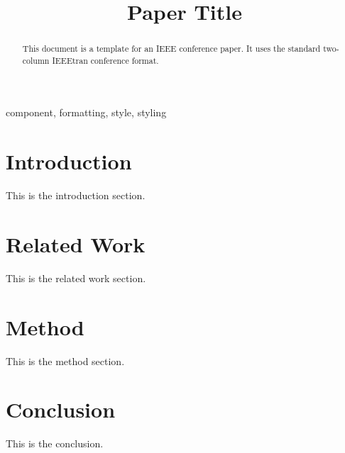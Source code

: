 \documentclass[conference]{IEEEtran}
\begin{document}
\title{Paper Title}

\author{
}

\maketitle

\begin{abstract}
This document is a template for an IEEE conference paper. It uses the
standard two-column IEEEtran conference format.
\end{abstract}

\begin{IEEEkeywords}
component, formatting, style, styling
\end{IEEEkeywords}

\section{Introduction}
This is the introduction section.

\section{Related Work}
This is the related work section.

\section{Method}
This is the method section.

\section{Conclusion}
This is the conclusion.
\end{document}
